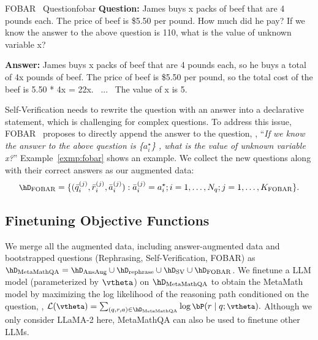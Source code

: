 \begin{exmp}{FOBAR~\citep{jiang2023backward} Question}{fobar}\small
\textbf{Question:} 
James buys {\color{red3}x} packs of beef that are 4 pounds each.  The price of beef is \$5.50 per pound.  How much did he pay?
{\color{red3}\!If we know the answer to the above question is 110, what is the value of unknown variable x?\!\!\!}

\textbf{Answer:}
James buys x packs of beef that are 4 pounds each, so he buys a total of 4x pounds of beef.
The price of beef is \$5.50 per pound, so the total cost of the beef is 5.50 * 4x = 22x.
~...~
The value of x is 5.
\end{exmp}

\vspace{3mm}
 
Self-Verification
needs to rewrite the question with an answer
into a declarative
statement,
which is challenging for complex questions.
To address this issue,
FOBAR~\citep{jiang2023backward} proposes to
directly append the answer to the question,
\ie,
``\textit{If we know the answer to the above question is \{$a_i^\star$\} , what is the value of unknown variable {\normalfont x}?}''
Example~\ref{exmp:fobar}
shows an example.
We collect the new questions along with their correct answers
as our augmented data:
\begin{equation}
\small
    \hD_{\text{FOBAR}} = \{(\bar{q}_i^{(j)}, \bar{r}_i^{(j)}, \bar{a}_i^{(j)}): \bar{a}_i^{(j)} = a_i^\star;  i=1,\dots, N_q; j=1,\dots, K_{\text{FOBAR}}\}.
\end{equation}
    

	
\subsection{Finetuning Objective Functions}
We merge all the augmented data, including answer-augmented data and bootstrapped questions (Rephrasing, Self-Verification, FOBAR) as $ \small{	\hD_{\text{MetaMathQA}} = \hD_{\text{AnsAug}}  \cup \hD_{\text{rephrase}} \cup \hD_{\text{SV}} \cup \hD_{\text{FOBAR}}}$.
We finetune a LLM model (parameterized by $\vtheta$) on $\hD_{\text{MetaMathQA}}$ to obtain the MetaMath model
by maximizing the log likelihood of the reasoning path conditioned on the question, \ie, $\small{
\mathcal{L}(\vtheta)= \sum_{(q, r, a) \in \hD_{\text{MetaMathQA}} } \log \bP(r \mid  q;\vtheta).
\label{eq:mle}}$ Although we only consider LLaMA-2 here, MetaMathQA can also be used to finetune other LLMs.
    
